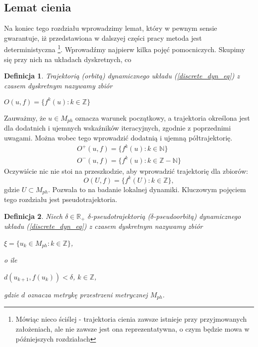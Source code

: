 \documentclass[12pt]{article}
\newtheorem{defi}{Definicja}
\begin{document}
\subsection{Lemat cienia}
Na koniec tego rozdziału wprowadzimy lemat, który w pewnym sensie gwarantuje, iż przedstawiona w dalszyej części pracy metoda jest deterministyczna \footnote{Mówiąc nieco ściślej - trajektoria cienia zawsze istnieje przy przyjmowanych założeniach, ale nie zawsze jest ona reprezentatywna, o czym będzie mowa w późniejszych rozdziałach}. Wprowadźmy najpierw kilka pojęć pomocniczych. Skupimy się przy nich na układach dyskretnych, co 
\begin{defi}\label{trajectory_discrete}
	Trajektorią (orbitą) dynamicznego układu (\ref{discrete_dyn_eq}) z czasem dyskretnym nazywamy zbiór
	\begin{center}
		$ O(u,f) = \{f^k(u): k \in \mathbb{Z}\} $
	\end{center} 
\end{defi}
Zauważmy, że $ u \in M_{ph} $ oznacza warunek początkowy, a trajektoria określona jest dla dodatnich i ujemnych wskaźników iteracyjnych, zgodnie z poprzednimi uwagami. Można wobec tego wprowadzić dodatnią i ujemną półtrajektorię.
\begin{equation}
\begin{array}{rcl} 
	O^{+}(u,f) = \{f^k(u): k \in \mathbb{N}\} \\
	O^{-}(u,f) = \{f^k(u): k \in \mathbb{Z} - \mathbb{N}\}
\end{array}
\end{equation}
Oczywiście nic nie stoi na przeszkodzie, aby wprowadzić trajektorię dla zbiorów:
\begin{equation}
	O(U,f) = \{f^k(U): k \in \mathbb{Z}\},
\end{equation}
gdzie $ U \subset M_{ph} $. Pozwala to na badanie lokalnej dynamiki. \newline
Kluczowym pojęciem tego rozdziału jest pseudotrajektoria.
\begin{defi}\label{pseudotrajectory}
	Niech $\delta \in \mathbb{R}_{+}$
	$\delta$-pseudotrajektorią ($ \delta $-pseudoorbitą) dynamicznego układu (\ref{discrete_dyn_eq}) z czasem dyskretnym nazywamy zbiór
	\begin{center}
		$ \xi = \{u_{k} \in M_{ph}: k\in \mathbb{Z}\}$,
	\end{center} 
	o ile
	\begin{center}
		$ d(u_{k+1},f(u_k))<\delta $, $ k \in \mathbb{Z} $,
	\end{center} 
	gdzie $ d $ oznacza metrykę przestrzeni metrycznej $ M_{ph} $.
\end{defi}
\end{document}
